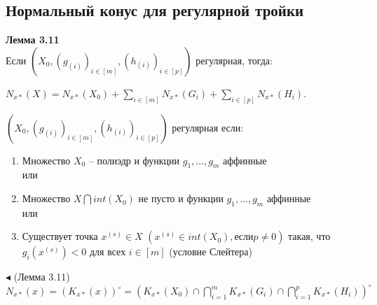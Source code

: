 \subsection{Нормальный конус для регулярной тройки}
\textbf{Лемма 3.11}\\
Если $(X_{0},(g_{(i)})_{i\in[m]},(h_{(i)})_{i\in[p]})$ регулярная, тогда:
\begin{center}
    $N_{x*}(X) = N_{x*}(X_{0}) + \sum_{i\in[m]}{N_{x*}(G_{i})} + \sum_{i\in[p]}{N_{x*}(H_{i})}$.\\
\end{center}
$(X_{0},(g_{(i)})_{i\in[m]},(h_{(i)})_{i\in[p]})$ регулярная если:
\begin{enumerate}
    \item Множество $X_{0}$ -- полиэдр и функции $g_{1},\ldots,g_{m}$ аффинные\\ или
    \item Множество $X\bigcap int(X_{0})$ не пусто и функции $g_{1},\ldots,g_{m}$ аффинные\\ или
    \item Существует точка $x^{(s)} \in X$ $(x^{(s)} \in int(X_{0}), если p \neq 0)$ такая, что $g_{i}(x^{(s)}) < 0$ для всех $i\in[m]$ (условие Слейтера)\\
\end{enumerate}
\noindent$\blacktriangleleft$ (Лемма 3.11)\\
$N_{x*}(x) = (K_{x*}(x))^{\circ} = (K_{x*}(X_{0})\cap\bigcap_{i=1}^{m} K_{x*}(G_{i})\cap\bigcap_{i=1}^{p} K_{x*}(H_{i}))^{\circ}$
